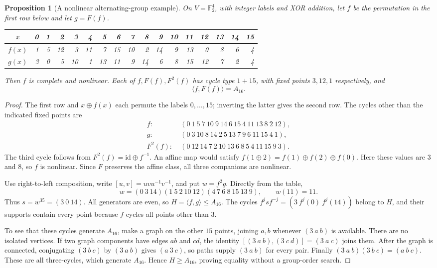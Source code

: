 \documentclass[11pt]{article}
\newtheorem{proposition}[theorem]{Proposition}
\begin{document}
\begin{proposition}[A nonlinear alternating-group example]\label{prop:nonlinear-A16}
On $V=\mathbb F_2^4$, with integer labels and XOR addition, let $f$ be
the permutation in the first row below and let $g=F(f)$.
\begin{center}
\small
\begin{tabular}{c|rrrrrrrrrrrrrrrr}
$x$&0&1&2&3&4&5&6&7&8&9&10&11&12&13&14&15\\ \hline
$f(x)$&1&5&12&3&11&7&15&10&2&14&9&13&0&8&6&4\\
$g(x)$&3&0&5&10&1&13&11&9&14&6&8&15&12&7&2&4
\end{tabular}
\end{center}
Then $f$ is complete and nonlinear. Each of $f,F(f),F^2(f)$ has cycle
type $1+15$, with fixed points $3,12,1$ respectively, and
\[
\langle f,F(f)\rangle=A_{16}.
\]
\end{proposition}
\begin{proof}
The first row and $x\oplus f(x)$ each permute the labels $0,\ldots,15$;
inverting the latter gives the second row.
The cycles other than the indicated fixed points are
\begin{align*}
f:\;&(0\ 1\ 5\ 7\ 10\ 9\ 14\ 6\ 15\ 4\ 11\ 13\ 8\ 2\ 12),\\
g:\;&(0\ 3\ 10\ 8\ 14\ 2\ 5\ 13\ 7\ 9\ 6\ 11\ 15\ 4\ 1),\\
F^2(f):\;&(0\ 12\ 14\ 7\ 2\ 10\ 13\ 6\ 8\ 5\ 4\ 11\ 15\ 9\ 3).
\end{align*}
The third cycle follows from $F^2(f)=\mathrm{id}\oplus f^{-1}$.
An affine map would satisfy
$f(1\oplus2)=f(1)\oplus f(2)\oplus f(0)$.
Here these values are $3$ and $8$, so $f$ is nonlinear.
Since $F$ preserves the affine class, all three companions are nonlinear.

Use right-to-left composition, write $[u,v]=uvu^{-1}v^{-1}$, and put
$w=f^2g$. Directly from the table,
\[
w=(0\ 3\ 14)(1\ 5\ 2\ 10\ 12)
   (4\ 7\ 6\ 8\ 15\ 13\ 9),
\qquad w(11)=11.
\]
Thus $s=w^{35}=(3\ 0\ 14)$.
All generators are even, so $H=\langle f,g\rangle\le A_{16}$.
The cycles $f^jsf^{-j}=(3\ f^j(0)\ f^j(14))$ belong to $H$,
and their supports contain every point because $f$ cycles all points
other than $3$.

To see that these cycles generate $A_{16}$, make a graph on the other
$15$ points, joining $a,b$ whenever $(3\ a\ b)$ is available.
There are no isolated vertices. If two graph components have edges
$ab$ and $cd$, the identity
$[(3\ a\ b),(3\ c\ d)]=(3\ a\ c)$ joins them.
After the graph is connected, conjugating $(3\ b\ c)$ by $(3\ a\ b)$
gives $(a\ 3\ c)$, so paths supply $(3\ a\ b)$ for every pair.
Finally $(3\ a\ b)(3\ b\ c)=(a\ b\ c)$.
These are all three-cycles, which generate $A_{16}$.
Hence $H\ge A_{16}$, proving equality without a group-order search.
\end{proof}
\end{document}
